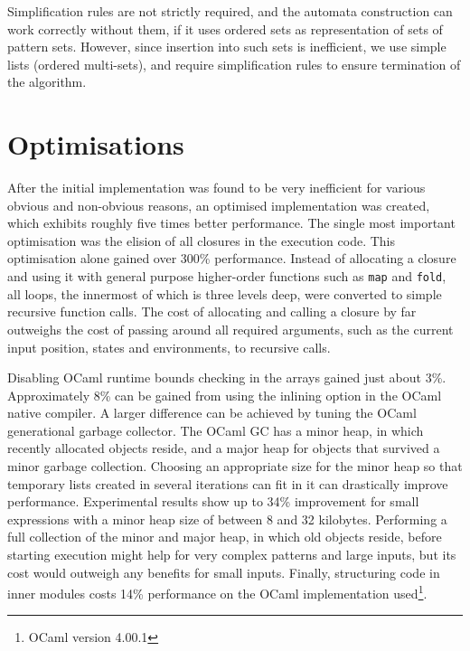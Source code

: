 \begin{rem}
   Simplification rules are not strictly required, and the automata construction
   can work correctly without them, if it uses ordered sets as representation of
   sets of pattern sets. However, since insertion into such sets is inefficient,
   we use simple lists (ordered multi-sets), and require simplification rules to
   ensure termination of the algorithm.
\end{rem}


\section{Optimisations}
\label{opts}

After the initial implementation was found to be very inefficient for various
obvious and non-obvious reasons, an optimised implementation was created, which
exhibits roughly five times better performance. The single most important
optimisation was the elision of all closures in the execution code. This
optimisation alone gained over 300\% performance. Instead of allocating a
closure and using it with general purpose higher-order functions such as
\texttt{map} and \texttt{fold}, all loops, the innermost of which is three
levels deep, were converted to simple recursive function calls. The cost of
allocating and calling a closure by far outweighs the cost of passing around all
required arguments, such as the current input position, states and
environments, to recursive calls.

Disabling OCaml runtime bounds checking in the arrays gained just about 3\%.
Approximately 8\% can be gained from using the inlining option in the OCaml
native compiler. A larger difference can be achieved by tuning the OCaml
generational garbage collector. The OCaml GC has a minor heap, in which recently
allocated objects reside, and a major heap for objects that survived a minor
garbage collection. Choosing an appropriate size for the minor heap so that
temporary lists created in several iterations can fit in it can drastically
improve performance. Experimental results show up to 34\% improvement for small
expressions with a minor heap size of between 8 and 32 kilobytes. Performing a
full collection of the minor and major heap, in which old objects reside, before
starting execution might help for very complex patterns and large inputs, but
its cost would outweigh any benefits for small inputs. Finally, structuring code
in inner modules costs 14\% performance on the OCaml implementation
used\footnote{OCaml version 4.00.1}.


